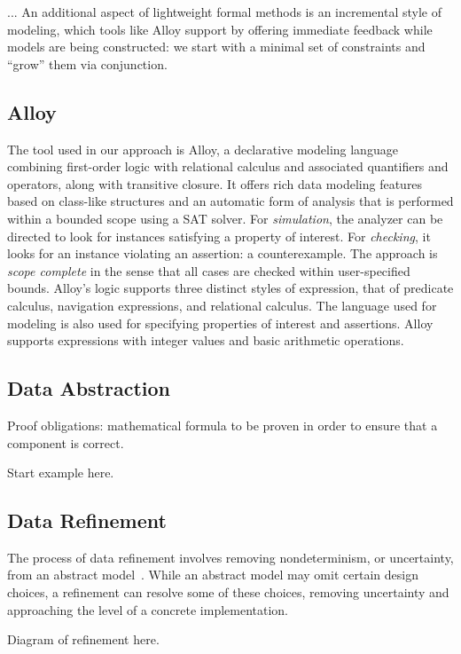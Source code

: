 \documentclass[11pt,conference]{IEEEtran}
\begin{document}
...
An additional aspect of lightweight formal methods is an incremental style of modeling, which tools like Alloy support by offering immediate feedback while models are being constructed: we start with a minimal set of constraints and ``grow'' them via conjunction.

\subsection{Alloy}

The tool used in our approach is Alloy, a declarative modeling language combining first-order logic with relational calculus and associated quantifiers and operators, along with transitive closure.  It offers rich data modeling features based on class-like structures and an automatic form of analysis that is performed within a bounded scope using a SAT solver.  For \emph{simulation}, the analyzer can be directed to look for instances satisfying a property of interest.  For \emph{checking}, it looks for an instance violating an assertion: a counterexample.  The approach is \emph{scope complete} in the sense that all cases are checked within user-specified bounds.  Alloy's logic supports three distinct styles of expression, that of predicate calculus, navigation expressions, and relational calculus.  The language used for modeling is also used for specifying properties of interest and assertions.  Alloy supports expressions with integer values and basic arithmetic operations.

\subsection{Data Abstraction}

Proof obligations: mathematical formula to be proven in order to ensure that a component is correct.

Start example here.

\subsection{Data Refinement}

The process of data refinement involves removing nondeterminism, or uncertainty, from an abstract model~\cite{woodcock1996}.  While an abstract model may omit certain design choices, a refinement can resolve some of these choices, removing uncertainty and approaching the level of a concrete implementation.

Diagram of refinement here.
\end{document}
